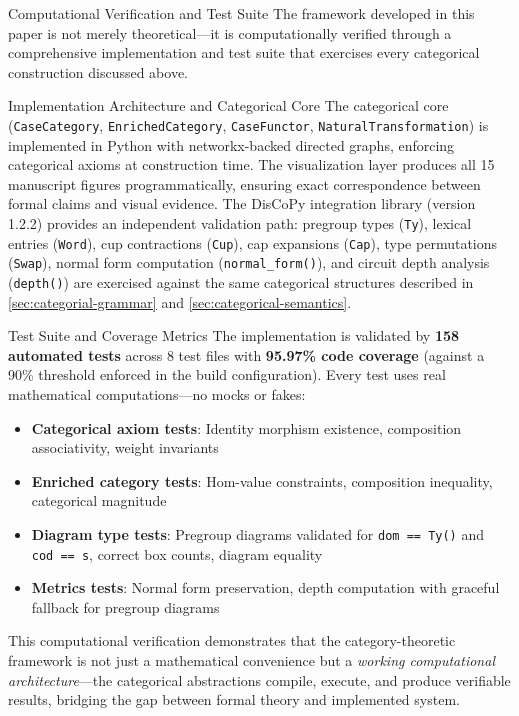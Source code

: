 \documentclass[
  ignorenonframetext,
]{beamer}
\providecommand{\tightlist}{%
  \setlength{\itemsep}{0pt}\setlength{\parskip}{0pt}}
\begin{document}
\begin{frame}[fragile]{Computational Verification and Test Suite}
\protect{}\label{computational-verification-and-test-suite}
The framework developed in this paper is not merely theoretical---it is
computationally verified through a comprehensive implementation and test
suite that exercises every categorical construction discussed above.

\begin{block}{Implementation Architecture and Categorical Core}
\protect{}\label{implementation-architecture-and-categorical-core}
The categorical core (\texttt{CaseCategory}, \texttt{EnrichedCategory},
\texttt{CaseFunctor}, \texttt{NaturalTransformation}) is implemented in
Python with networkx-backed directed graphs, enforcing categorical
axioms at construction time. The visualization layer produces all 15
manuscript figures programmatically, ensuring exact correspondence
between formal claims and visual evidence. The DisCoPy integration
library (version 1.2.2) provides an independent validation path:
pregroup types (\texttt{Ty}), lexical entries (\texttt{Word}), cup
contractions (\texttt{Cup}), cap expansions (\texttt{Cap}), type
permutations (\texttt{Swap}), normal form computation
(\texttt{normal\_form()}), and circuit depth analysis (\texttt{depth()})
are exercised against the same categorical structures described in
\autoref{sec:categorial-grammar} and
\autoref{sec:categorical-semantics}.
\end{block}

\begin{block}{Test Suite and Coverage Metrics}
\protect{}\label{test-suite-and-coverage-metrics}
The implementation is validated by \textbf{158 automated tests} across 8
test files with \textbf{95.97\% code coverage} (against a 90\% threshold
enforced in the build configuration). Every test uses real mathematical
computations---no mocks or fakes:

\begin{itemize}
\tightlist
\item
  \textbf{Categorical axiom tests}: Identity morphism existence,
  composition associativity, weight invariants
\item
  \textbf{Enriched category tests}: Hom-value constraints, composition
  inequality, categorical magnitude
\item
  \textbf{Diagram type tests}: Pregroup diagrams validated for
  \texttt{dom\ ==\ Ty()} and \texttt{cod\ ==\ s}, correct box counts,
  diagram equality
\item
  \textbf{Metrics tests}: Normal form preservation, depth computation
  with graceful fallback for pregroup diagrams
\end{itemize}

This computational verification demonstrates that the category-theoretic
framework is not just a mathematical convenience but a \emph{working
computational architecture}---the categorical abstractions compile,
execute, and produce verifiable results, bridging the gap between formal
theory and implemented system.
\end{block}
\end{frame}
\end{document}
